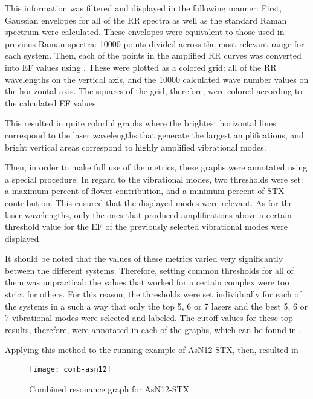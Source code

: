 This information was filtered and displayed in the following manner:
First, Gaussian envelopes for all of the RR spectra as well as the standard Raman spectrum were calculated.
These envelopes were equivalent to those used in previous Raman spectra: \num{10000} points divided across the most relevant range for each system.
Then, each of the points in the amplified RR curves was converted into EF values using .
These were plotted as a colored grid: all of the RR wavelengths on the vertical axis, and the \num{10000} calculated wave number values on the horizontal axis.
The squares of the grid, therefore, were colored according to the calculated EF values.

This resulted in quite colorful graphs where the brightest horizontal lines correspond to the laser wavelengths that generate the largest amplifications, and bright vertical areas correspond to highly amplified vibrational modes.

Then, in order to make full use of the metrics, these graphs were annotated using a special procedure.
In regard to the vibrational modes, two thresholds were set: a maximum percent of flower contribution, and a minimum percent of STX contribution.
This ensured that the displayed modes were relevant.
As for the laser wavelengths, only the ones that produced amplifications above a certain threshold value for the EF of the previously selected vibrational modes were displayed.

It should be noted that the values of these metrics varied very significantly between the different systems.
Therefore, setting common thresholds for all of them was unpractical: the values that worked for a certain complex were too strict for others.
For this reason, the thresholds were set individually for each of the systems in a such a way that only the top 5, 6 or 7 lasers and the best 5, 6 or 7 vibrational modes were selected and labeled.
The cutoff values for these top results, therefore, were annotated in each of the graphs, which can be found in .

Applying this method to the running example of AsN12-STX, then, resulted in 

\begin{figure}
    \texttt{[image: comb-asn12]}
    \caption[Combined resonance graph for AsN12-STX]{Combined resonance graph for AsN12-STX}
\end{figure}

